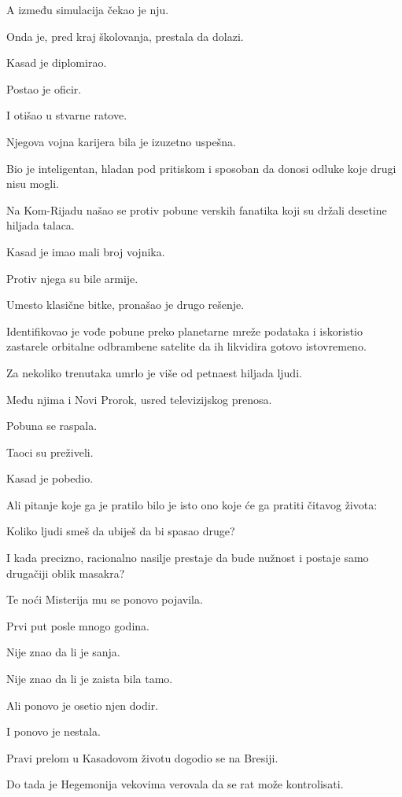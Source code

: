 A između simulacija čekao je nju.

Onda je, pred kraj školovanja, prestala da dolazi.

Kasad je diplomirao.

Postao je oficir.

I otišao u stvarne ratove.

\bigskip

Njegova vojna karijera bila je izuzetno uspešna.

Bio je inteligentan, hladan pod pritiskom i sposoban da donosi odluke koje drugi nisu mogli.

Na Kom-Rijadu našao se protiv pobune verskih fanatika koji su držali desetine hiljada talaca.

Kasad je imao mali broj vojnika.

Protiv njega su bile armije.

Umesto klasične bitke, pronašao je drugo rešenje.

Identifikovao je vođe pobune preko planetarne mreže podataka i iskoristio zastarele orbitalne odbrambene satelite da ih likvidira gotovo istovremeno.

Za nekoliko trenutaka umrlo je više od petnaest hiljada ljudi.

Među njima i Novi Prorok, usred televizijskog prenosa.

Pobuna se raspala.

Taoci su preživeli.

Kasad je pobedio.

Ali pitanje koje ga je pratilo bilo je isto ono koje će ga pratiti čitavog života:

Koliko ljudi smeš da ubiješ da bi spasao druge?

I kada precizno, racionalno nasilje prestaje da bude nužnost i postaje samo drugačiji oblik masakra?

Te noći Misterija mu se ponovo pojavila.

Prvi put posle mnogo godina.

Nije znao da li je sanja.

Nije znao da li je zaista bila tamo.

Ali ponovo je osetio njen dodir.

I ponovo je nestala.

\bigskip

Pravi prelom u Kasadovom životu dogodio se na Bresiji.

Do tada je Hegemonija vekovima verovala da se rat može kontrolisati.

